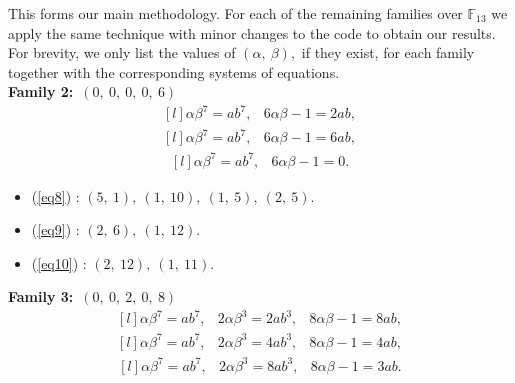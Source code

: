 \documentclass[12pt,a4wide, reqno]{amsart}
\theoremstyle{definition}
\theoremstyle{remark}
\numberwithin{equation}{section}
\begin{document}
This forms our main methodology. For each of the remaining families over $\mathbb{F}_{13}$ we apply the same technique with minor changes to the code to obtain our results. For brevity, we only list the values of $(\alpha,~\beta),$ if they exist, for each family together with the corresponding systems of equations.\\
\textbf{Family 2:}~$(0,~0,~0,~0,~6)$ 
\begin{equation}\label{eq8}
    \begin{matrix*}[l]
         \alpha \beta ^7=ab^7, & 6\alpha \beta -1=2ab,
    \end{matrix*}
\end{equation}
\begin{equation}\label{eq9}
    \begin{matrix*}[l]
         \alpha \beta ^7=ab^7, & 6\alpha \beta -1=6ab,
    \end{matrix*}
\end{equation}
\begin{equation}\label{eq10}
    \begin{matrix*}[l]
         \alpha \beta ^7=ab^7, & 6\alpha \beta -1=0.
    \end{matrix*}
\end{equation}
\begin{itemize}
    \item 
    (\ref{eq8}) : $(5,~1),~(1,~10),~(1,~5),~(2,~5).$
    \item 
    (\ref{eq9}) : $(2,~6),~(1,~12).$
    \item 
    (\ref{eq10}) : $(2,~12),~(1,~11).$ 
\end{itemize}
\textbf{Family 3:}~$(0,~0,~2,~0,~8)$ 
\begin{equation}\label{eq11}
    \begin{matrix*}[l]
         \alpha \beta ^7=ab^7, & 2\alpha \beta^3=2ab^3, & 8\alpha\beta -1=8ab,
    \end{matrix*}
\end{equation}
\begin{equation}\label{eq12}
    \begin{matrix*}[l]
        \alpha \beta ^7=ab^7, & 2\alpha \beta^3=4ab^3, & 8\alpha\beta -1=4ab,
    \end{matrix*}
\end{equation}
\begin{equation}\label{eq13}
    \begin{matrix*}[l]
         \alpha \beta ^7=ab^7, & 2\alpha \beta^3=8ab^3, & 8\alpha\beta -1=3ab.
    \end{matrix*}
\end{equation}
\end{document}
